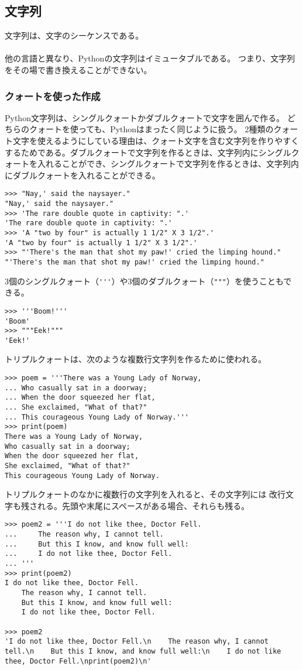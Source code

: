 \documentclass[11pt, oneside]{article}   	%
\begin{document}
\subsection{文字列}
文字列は、文字のシーケンスである。\\
 \\
 他の言語と異なり、Pythonの文字列はイミュータブルである。
 つまり、文字列をその場で書き換えることができない。\\
 
 \subsubsection{クォートを使った作成}
Python文字列は、シングルクォートかダブルクォートで文字を囲んで作る。
どちらのクォートを使っても、Pythonはまったく同じように扱う。
2種類のクォート文字を使えるようにしている理由は、クォート文字を含む文字列を作りやすくするためである。ダブルクォートで文字列を作るときは、文字列内にシングルクォートを入れることができ、シングルクォートで文字列を作るときは、文字列内にダブルクォートを入れることができる。
\begin{lstlisting}
>>> "Nay,' said the naysayer."
"Nay,' said the naysayer."
>>> 'The rare double quote in captivity: ".'
'The rare double quote in captivity: ".'
>>> 'A "two by four" is actually 1 1/2" X 3 1/2".'
'A "two by four" is actually 1 1/2" X 3 1/2".'
>>> "'There's the man that shot my paw!' cried the limping hound."
"'There's the man that shot my paw!' cried the limping hound."
\end{lstlisting}
3個のシングルクォート（\verb|'''|）や3個のダブルクォート（\verb|"""|）を使うこともできる。
\begin{lstlisting}
>>> '''Boom!'''
'Boom'
>>> """Eek!"""
'Eek!'
\end{lstlisting}
トリプルクォートは、次のような複数行文字列を作るために使われる。
\begin{lstlisting}
>>> poem = '''There was a Young Lady of Norway,
... Who casually sat in a doorway;
... When the door squeezed her flat,
... She exclaimed, "What of that?"
... This courageous Young Lady of Norway.'''
>>> print(poem)
There was a Young Lady of Norway,
Who casually sat in a doorway;
When the door squeezed her flat,
She exclaimed, "What of that?"
This courageous Young Lady of Norway.
\end{lstlisting}
トリプルクォートのなかに複数行の文字列を入れると、その文字列には
改行文字も残される。先頭や末尾にスペースがある場合、それらも残る。
\begin{lstlisting}
>>> poem2 = '''I do not like thee, Doctor Fell.
...     The reason why, I cannot tell.
...     But this I know, and know full well:
...     I do not like thee, Doctor Fell.
... '''
>>> print(poem2)
I do not like thee, Doctor Fell.
    The reason why, I cannot tell.
    But this I know, and know full well:
    I do not like thee, Doctor Fell.

>>> poem2
'I do not like thee, Doctor Fell.\n    The reason why, I cannot tell.\n    But this I know, and know full well:\n    I do not like thee, Doctor Fell.\nprint(poem2)\n'
\end{lstlisting}
\end{document}
